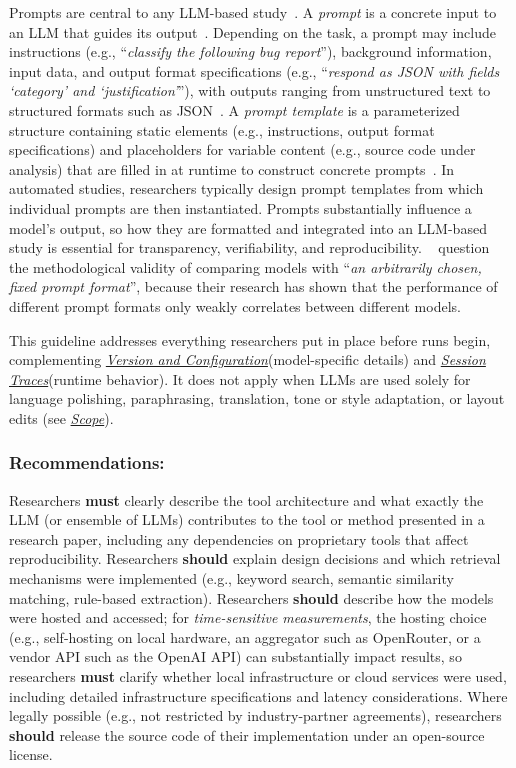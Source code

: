 \documentclass[smallextended]{svjour3}
\newcommand*{\enq}[1]{\enquote{{\itshape#1}}}
\newcommand{\must}{\textbf{must}\xspace}
\newcommand{\should}{\textbf{should}\xspace}
\newcommand{\scope}{\hyperref[sec:scope]{\emph{Scope}}\xspace}
\newcommand{\scope}{\href{/scope/}{\emph{Scope}}\xspace}
\newcommand{\modelversion}{\hyperref[sec:report-model-version-configuration-and-customizations]{\emph{Version and Configuration}}\xspace}
\newcommand{\traces}{\hyperref[sec:report-session-traces]{\emph{Session Traces}}\xspace}
\newcommand{\modelversion}{\href{/guidelines\#report-model-version-configuration-and-customizations}{\emph{Version and Configuration}}\xspace}
\newcommand{\traces}{\href{/guidelines\#report-session-traces}{\emph{Session Traces}}\xspace}
\newcommand{\guidelinesubsubsection}[1]{\subsubsection{\bfseries #1:}}
\newcommand{\guidelinesubsubsection}[1]{\subsubsection{#1}}
\begin{document}
Prompts are central to any LLM-based study~\cite{DBLP:conf/iclr/Sclar0TS24}.
A \emph{prompt} is a concrete input to an LLM that guides its output~\cite{DBLP:journals/corr/abs-2406-06608}.
Depending on the task, a prompt may include instructions (e.g., \enq{classify the following bug report}), background information, input data, and output format specifications (e.g., \enq{respond as JSON with fields `category' and `justification'}), with outputs ranging from unstructured text to structured formats such as JSON~\cite{promptingguide_elements}.
A \emph{prompt template} is a parameterized structure containing static elements (e.g., instructions, output format specifications) and placeholders for variable content (e.g., source code under analysis) that are filled in at runtime to construct concrete prompts~\cite{DBLP:journals/corr/abs-2406-06608}.
In automated studies, researchers typically design prompt templates from which individual prompts are then instantiated.
Prompts substantially influence a model's output, so how they are formatted and integrated into an LLM-based study is essential for transparency, verifiability, and reproducibility.
\citeauthor{DBLP:conf/iclr/Sclar0TS24}~\cite{DBLP:conf/iclr/Sclar0TS24} question the methodological validity of comparing models with \enq{an arbitrarily chosen, fixed prompt format}, because their research has shown that the performance of different prompt formats only weakly correlates between different models.

This guideline addresses everything researchers put in place before runs begin, complementing \modelversion (model-specific details) and \traces (runtime behavior).
It does not apply when LLMs are used solely for language polishing, paraphrasing, translation, tone or style adaptation, or layout edits (see \scope).

\guidelinesubsubsection{Recommendations}

Researchers \must clearly describe the tool architecture and what exactly the LLM (or ensemble of LLMs) contributes to the tool or method presented in a research paper, including any dependencies on proprietary tools that affect reproducibility.
Researchers \should explain design decisions and which retrieval mechanisms were implemented (e.g., keyword search, semantic similarity matching, rule-based extraction).
Researchers \should describe how the models were hosted and accessed; for \emph{time-sensitive measurements}, the hosting choice (e.g., self-hosting on local hardware, an aggregator such as OpenRouter, or a vendor API such as the OpenAI API) can substantially impact results, so researchers \must clarify whether local infrastructure or cloud services were used, including detailed infrastructure specifications and latency considerations.
Where legally possible (e.g., not restricted by industry-partner agreements), researchers \should release the source code of their implementation under an open-source license.
\end{document}
